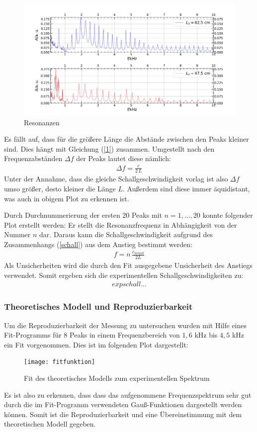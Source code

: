 \documentclass[german,  %
parskip=full,  %
]{scrartcl}
\begin{document}
\begin{figure}[h]
\centering
\includegraphics[width=\textwidth]{4.2.1_Resonanzen} %
\caption{Resonanzen}
\end{figure}

Es fällt auf, dass für die größere Länge die Abstände zwischen den Peaks kleiner sind. Dies hängt mit Gleichung (\ref{1}) zusammen. Umgestellt nach den Frequenzabständen $\Delta f$ der Peaks lautet diese nämlich:
\begin{align}
\Delta f = \frac{c}{2\,L} 
\end{align}
Unter der Annahme, dass die gleiche Schallgeschwindigkeit vorlag ist also $\Delta f$ umso größer, desto kleiner die Länge $L$. Außerdem sind diese immer äquidistant, was auch in obigem Plot zu erkennen ist.


Durch Durchnummerierung der ersten 20 Peaks mit $n=1,...,20$ konnte folgender Plot erstellt werden:
Er stellt die Resonanzfrequenz in Abhängigkeit von der Nummer $n$ dar. Daraus kann die Schallgeschwindigkeit aufgrund des Zusammenhangs (\ref{schall}) aus dem Anstieg bestimmt werden:
\begin{align}
\label{schall} f = n\, \frac{c_{Schall}}{2L}
\end{align}
Als Unsicherheiten wird die durch den Fit ausgegebene Unsicherheit des Anstiegs verwendet. Somit ergeben sich die experimentellen Schallgeschwindigkeiten zu:
\begin{align}
exp schall... %
\end{align}

\subsubsection{Theoretisches Modell und Reproduzierbarkeit}
Um die Reproduzierbarkeit der Messung zu untersuchen wurden mit Hilfe eines Fit-Programms für 8 Peaks in einem Frequenzbereich von $1,6$ kHz bis $4,5$ kHz ein Fit vorgenommen. Dies ist im folgenden Plot dargestellt:
\begin{figure}[h]
\centering
\texttt{[image: fitfunktion]}
\caption{Fit des theoretisches Modells zum experimentellen Spektrum}
\end{figure}
Es ist also zu erkennen, dass dass das aufgenommene Frequenzspektrum sehr gut durch die im Fit-Programm verwendeten Gauß-Funktionen dargestellt werden können.
Somit ist die Reproduzierbarkeit und eine Übereinstimmung mit dem theoretischen Modell gegeben. %
\end{document}
